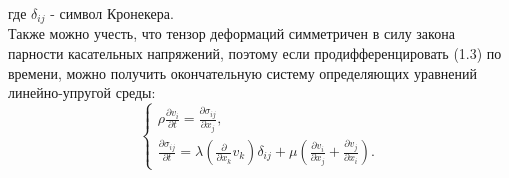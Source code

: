 \documentclass[12pt,a4paper, titlepage, openany]{book}
\begin{document}
где $\delta_{ij}$ - символ Кронекера. 
\\
Также можно учесть, что тензор деформаций симметричен в силу закона парности касательных напряжений, поэтому если продифференцировать (1.3) по времени, можно получить окончательную систему определяющих уравнений линейно-упругой среды:
\begin{equation}
\begin{cases}
\rho \frac{\partial v_i}{\partial t} = \frac{\partial \sigma_{ij}}{\partial x_j}, \\
\frac{\partial \sigma_{ij}}{\partial t} = \lambda(\frac{\partial}{\partial x_k} v_k) \delta_{ij} + \mu(\frac{\partial v_i}{\partial x_j} + \frac{\partial v_j}{\partial x_i}).
\end{cases}
\end{equation}
\end{document}
